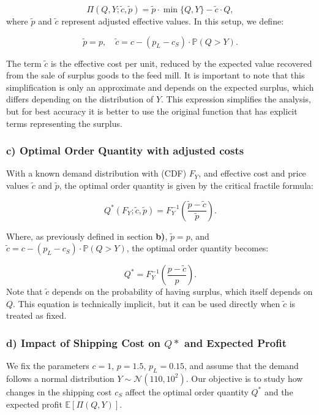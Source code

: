 \documentclass{article}
\begin{document}
\[
\Pi(Q, Y; \tilde{c}, \tilde{p}) = \tilde{p} \cdot \min\{Q, Y\} - \tilde{c} \cdot Q,
\]
\noindent
where $\tilde{p}$ and $\tilde{c}$ represent adjusted effective values. In this setup, we define:

\[
\tilde{p} = p, \quad \tilde{c} = c - (p_L - c_S) \cdot \mathbb{P}(Q > Y).
\]

\noindent
The term $\tilde{c}$ is the effective cost per unit, reduced by the expected value recovered from the sale of surplus goods to the feed mill. It is important to note that this simplification is only an approximate and depends on the expected surplus, which differs depending on the distribution of $Y$. This expression simplifies the analysis, but for best accuracy it is better to use the original function that has explicit terms representing the surplus.


\subsubsection*{c) Optimal Order Quantity with adjusted costs}
\noindent 
With a known demand distribution with (CDF) $F_Y$, and effective cost and price values $\tilde{c}$ and $\tilde{p}$, the optimal order quantity is given by the critical fractile formula:

\[
Q^*(F_Y; \tilde{c}, \tilde{p}) = F_Y^{-1} \left( \frac{\tilde{p} - \tilde{c}}{\tilde{p}} \right).
\]

\noindent
Where, as previously defined in section \textbf{b)}, $\tilde{p} = p$, and $\tilde{c} = c - (p_L - c_S) \cdot \mathbb{P}(Q > Y)$, the optimal order quantity becomes:

\[
Q^* = F_Y^{-1} \left( \frac{p - \tilde{c}}{p} \right).
\]
\noindent
Note that $\tilde{c}$ depends on the probability of having surplus, which itself depends on $Q$. This equation is technically implicit, but it can be used directly when $\tilde{c}$ is treated as fixed.


\subsubsection*{\boldmath d) Impact of Shipping Cost on $Q*$ and Expected Profit}

We fix the parameters $c = 1$, $p = 1.5$, $p_L = 0.15$, and assume that the demand follows a normal distribution $Y \sim \mathcal{N}(110, 10^2)$. Our objective is to study how changes in the shipping cost $c_S$ affect the optimal order quantity $Q^*$ and the expected profit $\mathbb{E}[\Pi(Q, Y)]$. \bigskip
\end{document}
